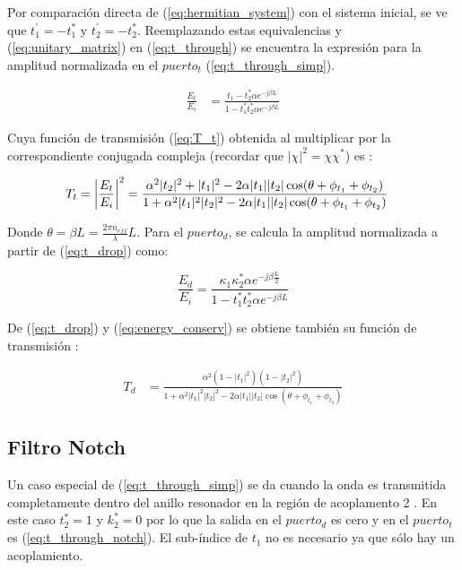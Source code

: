 Por comparación directa de (\ref{eq:hermitian_system}) con el sistema inicial, 
se ve que $t_1^{'} = -t_1^*$ y $t_2^{'} = -t_2^*$.
Reemplazando estas equivalencias y  
(\ref{eq:unitary_matrix}) en (\ref{eq:t_through}) se encuentra la
expresión para la amplitud normalizada en el $puerto_t$ (\ref{eq:t_through_simp}).

\begin{align}
\frac{E_t}{E_i} &= 
    \frac{t_1 - t_2^* \alpha e^{-j \beta L}}
    {1 - t_1^* t_2^* \alpha e^{-j \beta L}} \label{eq:t_through_simp}
\end{align} 

Cuya función de transmisión (\ref{eq:T_t}) obtenida al multiplicar
por la correspondiente conjugada compleja (recordar que $|\chi|^2 = \chi \chi^*$)
es \cite{paloczi2005polymer}:

\begin{align}
 T_t &= \abs*{\frac{E_t}{E_i}}^2 = 
    \frac{\alpha^2 |t_2|^2 + |t_1|^2 - 2\alpha |t_1||t_2| 
	\cos(\theta + \phi_{t_1} + \phi_{t_2}) }
    {1 + \alpha^2|t_1|^2 |t_2|^2 - 2\alpha |t_1||t_2|
	\cos(\theta + \phi_{t_1} + \phi_{t_2}) }
\label{eq:T_t}
\end{align} 

Donde $\theta = \beta L = \frac{2\pi n_{eff}}{\lambda} L$. Para el $puerto_d$, se calcula la amplitud normalizada a partir de (\ref{eq:t_drop}) como:

\begin{equation}
\frac{E_d}{E_i} = \frac{ \kappa_1 \kappa_2^* \alpha e^{ -j \beta \frac{L}{2}} }
	   { 1 - t_1^* t_2^* \alpha e^{-j \beta L} }
\label{eq:t_drop_simp}
\end{equation} 

De (\ref{eq:t_drop}) y (\ref{eq:energy_conserv}) se obtiene también su función de
transmisión \cite{abujnah2012numerical}:

\begin{align}
 T_d &= 
    \frac{\alpha^2 (1-|t_1|^2) (1-|t_2|^2)}
    {1 + \alpha^2|t_1|^2 |t_2|^2 - 2\alpha |t_1||t_2|
	\cos(\theta + \phi_{t_1} + \phi_{t_2}) }
\label{eq:T_d}
\end{align} 

\subsection{Filtro Notch}
\label{ss:notch}

Un caso especial de (\ref{eq:t_through_simp}) se da cuando la onda es 
transmitida completamente dentro del anillo resonador en la región de acoplamento 2 \cite{yariv2006photonics}. 
En este caso $t_2^* = 1$ y $k_2^* = 0$ por lo que la salida en el $puerto_d$ es cero y
en el $puerto_t$ es (\ref{eq:t_through_notch}).
El sub-índice de $t_1$ no es necesario ya que sólo hay un acoplamiento.

